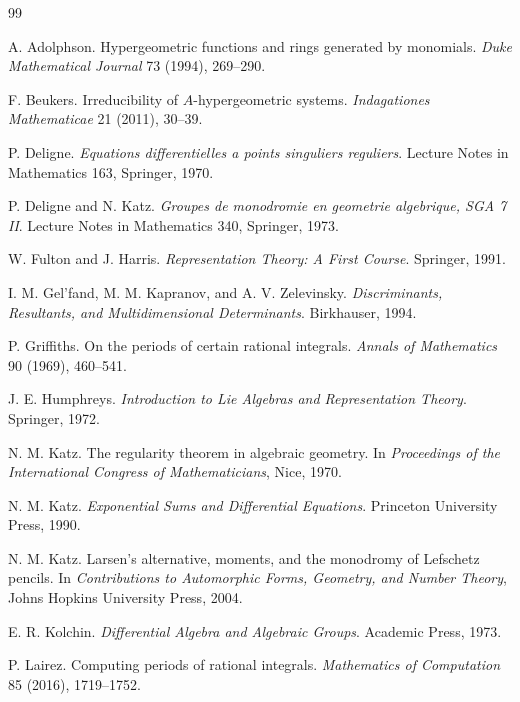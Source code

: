 \documentclass[11pt]{article}
\begin{document}
\begin{thebibliography}{99}

A. Adolphson.
\newblock Hypergeometric functions and rings generated by monomials.
\newblock \emph{Duke Mathematical Journal} 73 (1994), 269--290.

F. Beukers.
\newblock Irreducibility of \(A\)-hypergeometric systems.
\newblock \emph{Indagationes Mathematicae} 21 (2011), 30--39.

P. Deligne.
\newblock \emph{Equations differentielles a points singuliers reguliers}.
\newblock Lecture Notes in Mathematics 163, Springer, 1970.

P. Deligne and N. Katz.
\newblock \emph{Groupes de monodromie en geometrie algebrique, SGA 7 II}.
\newblock Lecture Notes in Mathematics 340, Springer, 1973.

W. Fulton and J. Harris.
\newblock \emph{Representation Theory: A First Course}.
\newblock Springer, 1991.

I. M. Gel'fand, M. M. Kapranov, and A. V. Zelevinsky.
\newblock \emph{Discriminants, Resultants, and Multidimensional Determinants}.
\newblock Birkhauser, 1994.

P. Griffiths.
\newblock On the periods of certain rational integrals.
\newblock \emph{Annals of Mathematics} 90 (1969), 460--541.

J. E. Humphreys.
\newblock \emph{Introduction to Lie Algebras and Representation Theory}.
\newblock Springer, 1972.

N. M. Katz.
\newblock The regularity theorem in algebraic geometry.
\newblock In \emph{Proceedings of the International Congress of Mathematicians}, Nice, 1970.

N. M. Katz.
\newblock \emph{Exponential Sums and Differential Equations}.
\newblock Princeton University Press, 1990.

N. M. Katz.
\newblock Larsen's alternative, moments, and the monodromy of Lefschetz pencils.
\newblock In \emph{Contributions to Automorphic Forms, Geometry, and Number Theory}, Johns Hopkins University Press, 2004.

E. R. Kolchin.
\newblock \emph{Differential Algebra and Algebraic Groups}.
\newblock Academic Press, 1973.

P. Lairez.
\newblock Computing periods of rational integrals.
\newblock \emph{Mathematics of Computation} 85 (2016), 1719--1752.


\end{thebibliography}
\end{document}
